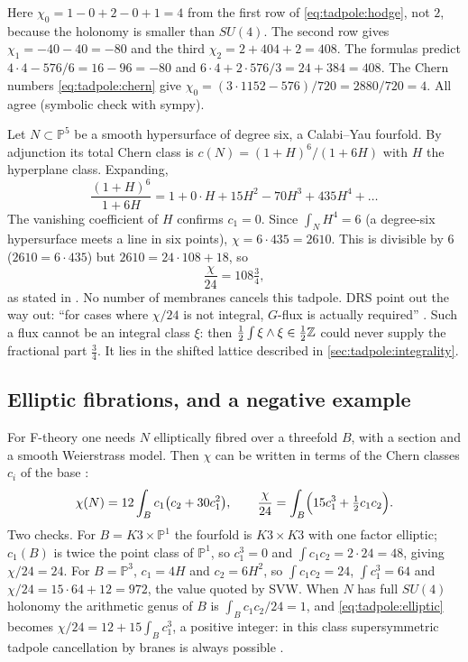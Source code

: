 \begin{example}\label{ex:tadpole:check}
Here $\chi_0=1-0+2-0+1=4$ from the first row of \eqref{eq:tadpole:hodge}, not $2$, because the
holonomy is smaller than $SU(4)$. The second row gives $\chi_1=-40-40=-80$ and the third
$\chi_2=2+404+2=408$. The formulas predict $4\cdot4-576/6=16-96=-80$ and
$6\cdot4+2\cdot576/3=24+384=408$. The Chern numbers \eqref{eq:tadpole:chern} give
$\chi_0=(3\cdot1152-576)/720=2880/720=4$. All agree (symbolic check with sympy).
\end{example}

\begin{example}\label{ex:tadpole:sextic}
Let $N\subset\mathbb P^5$ be a smooth hypersurface of degree six, a Calabi--Yau fourfold.
By adjunction its total Chern class is $c(N)=(1+H)^6/(1+6H)$ with $H$ the hyperplane class.
Expanding,
\[
 \frac{(1+H)^6}{1+6H}=1+0\cdot H+15H^2-70H^3+435H^4+\dots
\]
The vanishing coefficient of $H$ confirms $c_1=0$. Since $\int_NH^4=6$ (a degree-six
hypersurface meets a line in six points), $\chi=6\cdot435=2610$. This is divisible by $6$
($2610=6\cdot435$) but $2610=24\cdot108+18$, so
\[
 \frac{\chi}{24}=108\tfrac34 ,
\]
as stated in . No number of membranes cancels this tadpole.
DRS point out the way out: ``for cases where $\chi/24$ is not integral, $G$-flux is actually
required'' . Such a flux cannot be an integral class $\xi$: then
$\tfrac12\int\xi\wedge\xi\in\tfrac12\mathbb{Z}$ could never supply the fractional part $\tfrac34$.
It lies in the shifted lattice described in \cref{sec:tadpole:integrality}.
\end{example}

\subsection{Elliptic fibrations, and a negative example}
For F-theory one needs $N$ elliptically fibred over a threefold $B$, with a section and a
smooth Weierstrass model. Then $\chi$ can be written in terms of the Chern classes $c_i$ of
the base :
\begin{equation}\label{eq:tadpole:elliptic}
 \chi(N)=12\int_Bc_1\bigl(c_2+30c_1^2\bigr),\qquad
 \frac{\chi}{24}=\int_B\Bigl(15c_1^3+\tfrac12c_1c_2\Bigr).
\end{equation}
Two checks. For $B=K3\times\mathbb P^1$ the fourfold is $K3\times K3$ with one factor
elliptic; $c_1(B)$ is twice the point class of $\mathbb P^1$, so $c_1^3=0$ and
$\int c_1c_2=2\cdot24=48$, giving $\chi/24=24$. For $B=\mathbb P^3$, $c_1=4H$ and $c_2=6H^2$,
so $\int c_1c_2=24$, $\int c_1^3=64$ and $\chi/24=15\cdot64+12=972$, the value quoted by SVW.
When $N$ has full $SU(4)$ holonomy the arithmetic genus of $B$ is $\int_Bc_1c_2/24=1$, and
\eqref{eq:tadpole:elliptic} becomes $\chi/24=12+15\int_Bc_1^3$, a positive integer: in this
class supersymmetric tadpole cancellation by branes is always possible
. \TL

